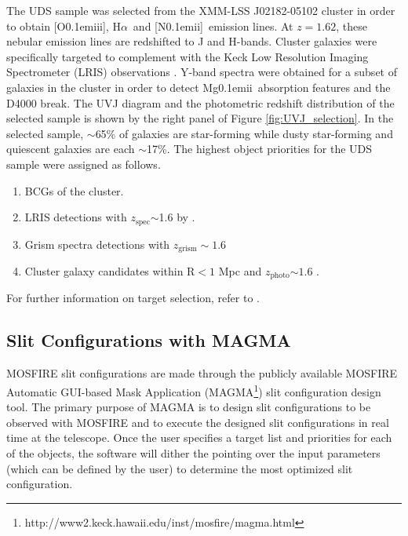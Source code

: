 \documentclass[iop]{emulateapj}
\newcommand{\Halpha}{H$\alpha$}
\newcommand{\NII}{[\hbox{{\rm N}\kern 0.1em{\sc ii}}]}
\newcommand{\OIII}{[\hbox{{\rm O}\kern 0.1em{\sc iii}}]}
\newcommand{\MgII}{\hbox{{\rm Mg}\kern 0.1em{\sc ii}}}
\newcommand{\around}{$\sim$}
\newcommand{\zspec}{$z_{\mathrm{spec}}$}
\newcommand{\zphoto}{$z_{\mathrm{photo}}$}
\begin{document}
The UDS sample was selected from  the XMM-LSS J02182-05102  cluster \citep{Papovich2010,Tanaka2010} in order to obtain \OIII, \Halpha\ and \NII\ emission lines. At $z=1.62$, these nebular emission lines are redshifted to J and H-bands. 
Cluster galaxies were specifically targeted to complement with the Keck Low Resolution Imaging Spectrometer (LRIS) observations \citep{Tran2015}. 
Y-band spectra were obtained for a subset of galaxies in the cluster in order to detect \MgII\ absorption features and the D4000 break. 
The UVJ diagram and the photometric redshift distribution of the selected sample is shown by the right panel of Figure \ref{fig:UVJ_selection}. In the selected sample, \around65\% of galaxies are star-forming while dusty star-forming and quiescent galaxies are each \around17\%. 
The highest object priorities for the UDS sample were assigned as follows. 
\begin{enumerate}
\item BCGs of the \citet{Papovich2010} cluster. 
\item LRIS detections with \zspec$\sim$1.6 by \cite{Tran2015}. 
\item Grism spectra detections with $z_{\mathrm{grism}}\sim1.6$ \citep[3DHST][]{Momcheva2015}
\item Cluster galaxy candidates within R$<1$ Mpc and \zphoto$\sim1.6$ \citep{Papovich2010}. 
\end{enumerate} 
For further information on target selection, refer to \citet{Tran2015}. 



\subsection{Slit Configurations with MAGMA}
\label{sec:mask_design}

MOSFIRE slit configurations are made through the publicly available MOSFIRE Automatic GUI-based Mask Application (MAGMA\footnote{http://www2.keck.hawaii.edu/inst/mosfire/magma.html}) slit configuration design tool. 
The primary purpose of MAGMA is to design slit configurations to be observed with MOSFIRE and to execute the designed slit configurations in real time at the telescope. 
Once the user specifies a target list and priorities for each of the objects, the software will dither the pointing over the input parameters (which can be defined by the user) to determine the most optimized slit configuration. 
\end{document}

